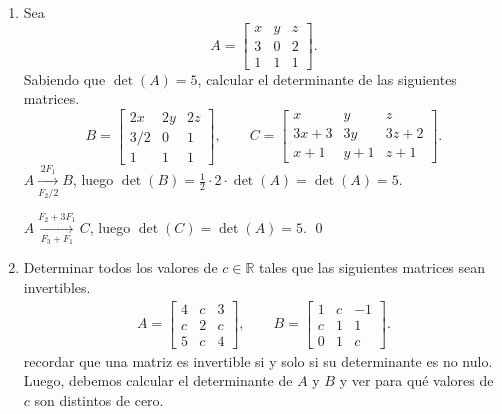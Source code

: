 \begin{enumerate}[topsep=6pt,itemsep=.4cm]
    \item  Sea
    $$A=
    \begin{bmatrix}
        x&y&z \\
        3&0&2\\
        1&1&1
    \end{bmatrix}.$$
    Sabiendo que $\det(A) = 5$, calcular el determinante de las siguientes matrices.
    $$
    B = \begin{bmatrix}
    2x&2y&2z \\
    3/2&0&1\\
    1&1&1
    \end{bmatrix}, \qquad
    C=
    \begin{bmatrix}
        x&y&z \\
        3x+3&3y&3z+2\\
        x+1&y+1&z+1
    \end{bmatrix}.
    $$
    \rta
    $A \underset{F_2/2}{\overset{2F_1}{\longrightarrow}} B$, luego  $\det(B) = \frac12 \cdot 2\cdot \det(A) = \det(A) = 5$.

    $A \underset{F_3+F_1}{\overset{F_2+3F_1}{\longrightarrow}} C$, luego  $\det(C) = \det(A) = 5$.
    \qed
    
    \item Determinar todos los valores de $c\in\mathbb{R}$ tales que las siguientes matrices sean invertibles.
    \begin{align*}
    A=\begin{bmatrix}4& c&3\\c&2&c\\ 5&c&4 \end{bmatrix},\qquad
    B=\begin{bmatrix} 1&c&-1\\ c&1&1\\0&1&c\end{bmatrix}.
    \end{align*}
    \rta recordar que una matriz es invertible si y solo si  su determinante es no nulo. Luego, debemos calcular el determinante de $A$ y $B$ y ver para qué valores de $c$ son distintos de cero.



\end{enumerate}
